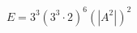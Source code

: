 \documentclass[preview]{standalone}
\begin{document}
\begin{align*}
E = 3^3 (3^3 \cdot 2)^6 (|A^2|)^2
\end{align*}
\end{document}
